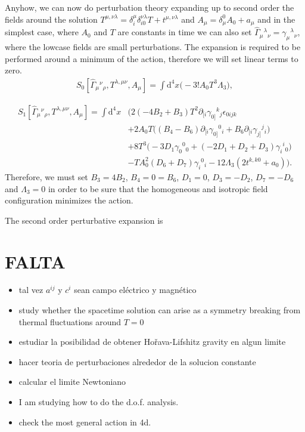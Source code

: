 \documentclass[%
  showpacs,showkeys,prd,superscriptaddress]{revtex4-1}
\def\md{{\mathrm{d}}}
\begin{document}
Anyhow, we can now do perturbation theory expanding up to second order the fields around the solution $T^{\mu,\nu\lambda} = \delta^{\mu}_i \delta_{i0}^{\nu\lambda}T + t^{\mu,\nu\lambda}$ and $A_\mu=\delta_\mu^0A_0+a_\mu$ and in the simplest case, where $A_0$ and $T$ are constants in time we can also set $\hat\Gamma_\mu{}^\lambda{}_\nu=\gamma_\mu{}^\lambda{}_\nu$, where the lowcase fields are small perturbations. The expansion is required to be performed around a minimum of the action, therefore we will set linear terms to zero. 
\begin{align}
  \label{3+1fullPerturbed}
   S_0[\hat\Gamma_{\mu}{}^{\nu}{}_\rho,T^{\lambda,\mu\nu},A_\mu]=\int\md^4x\Bigg(-3!A_0T^3\Lambda_3\Bigg),
\end{align}

\begin{equation}
  \begin{split}
    \label{3+1full1stOrder}
    S_1[\hat\Gamma_{\mu}{}^{\nu}{}_\rho,T^{\lambda,\mu\nu},A_\mu] = \int\md^4x &\Bigg(2(-4B_2+B_3)T^2\partial_{[i}\gamma_{0]}{}^k{}_j\epsilon_{0ijk} \\
    & + 2 A_0 T \big((B_4-B_6)\partial_{[i}\gamma_{0]}{}^0{}_i+B_6\partial_{[i}\gamma_{j]}{}^j{}_i\big)\\
    & + 8 T^3 \big(-3D_1\gamma_0{}^0{}_0+(-2D_1+D_2+D_3)\gamma_i{}^i{}_0\big)\\
    & - T A_0^2(D_6+D_7)\gamma_i{}^0{}_i -12\Lambda_3( 2t^{k,k0}+a_0)\Bigg).
  \end{split}
\end{equation}
Therefore, we must set $B_3=4B_2$, $B_4=0=B_6$, $D_1=0$, $D_3=-D_2$,  $D_7=-D_6$ and $\Lambda_3=0$ in order to be sure that the homogeneous and isotropic field configuration minimizes the action. 

The second order perturbative expansion  is

\section*{FALTA}

\begin{itemize}
\item tal vez $a^{ij}$ y $c^i$ sean campo el\'ectrico y magn\'etico

\item study  whether the spacetime solution can arise as a symmetry breaking from thermal fluctuations around $T=0$

\item estudiar la posibilidad de obtener Ho\v{r}ava-Lifshitz gravity en algun limite

\item hacer teoria de perturbaciones alrededor de la solucion constante

\item calcular el limite Newtoniano

\item I am studying how to do the d.o.f. analysis.
\item check the most general action in 4d.
\end{itemize}

\nocite{Tucker:1996sx,Horava:2009uw,Lu:2009em,Gibbs:1995gj,WheelerPre}



\end{document}
